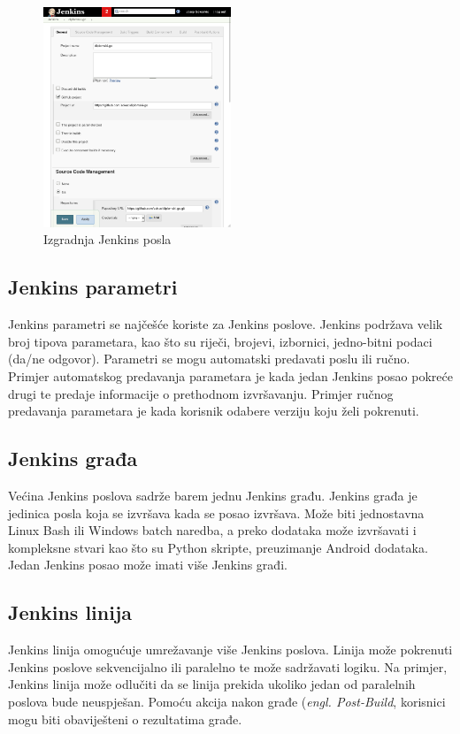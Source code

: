 \begin{figure}
    \centering
    \includegraphics[width=0.5\textwidth]{img/02/jenkins_job.png}
    \caption{Izgradnja Jenkins posla}%
    \label{fig:02jenkinsjob}
\end{figure}

\subsection{Jenkins parametri}
Jenkins parametri se najčešće koriste za Jenkins poslove. Jenkins podržava velik broj tipova
parametara, kao što su riječi, brojevi, izbornici, jedno-bitni podaci (da/ne odgovor). Parametri se
mogu automatski predavati poslu ili ručno. Primjer automatskog predavanja parametara je kada jedan
Jenkins posao pokreće drugi te predaje informacije o prethodnom izvršavanju. Primjer ručnog
predavanja parametara je kada korisnik odabere verziju koju želi pokrenuti.

\subsection{Jenkins građa}
Većina Jenkins poslova sadrže barem jednu Jenkins građu. Jenkins građa je jedinica posla koja se
izvršava kada se posao izvršava. Može biti jednostavna Linux Bash ili Windows batch naredba, a preko
dodataka može izvršavati i kompleksne stvari kao što su Python skripte, preuzimanje Android
dodataka. Jedan Jenkins posao može imati više Jenkins građi.

\subsection{Jenkins linija}
Jenkins linija omogućuje umrežavanje više Jenkins poslova. Linija može pokrenuti Jenkins poslove
sekvencijalno ili paralelno te može sadržavati logiku. Na primjer, Jenkins linija može odlučiti da
se linija prekida ukoliko jedan od paralelnih poslova bude neuspješan. Pomoću akcija nakon građe
(\textit{engl. Post-Build}, korisnici mogu biti obaviješteni o rezultatima građe.

